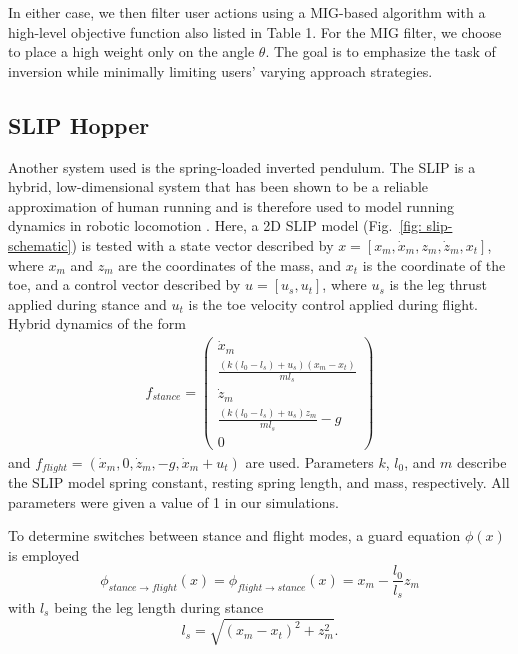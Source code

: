 In either case, we then filter user actions using a MIG-based algorithm with a high-level objective function also listed in Table 1. For the MIG filter, we choose to place a high weight only on the angle $\theta$. The goal is to emphasize the task of inversion while minimally limiting users' varying approach strategies.


\subsection{SLIP Hopper}

Another system used is the spring-loaded inverted pendulum. The SLIP is a hybrid, low-dimensional system that has been shown to be a reliable approximation of human running \cite{SLIP_for_running_nature} and is therefore used to model running dynamics in robotic locomotion \cite{SLIP_robot_evidence}. Here, a 2D SLIP model (Fig.~\ref{fig: slip-schematic}) is tested with a state vector described by $x = [x_m, \dot{x}_m, z_m, \dot{z}_m, x_t]$, where $x_m$ and $z_m$ are the coordinates of the mass, and $x_t$ is the coordinate of the toe, and a control vector described by $u = [u_s,u_t]$, where $u_s$ is the leg thrust applied during stance and $u_t$ is the toe velocity control applied during flight. Hybrid dynamics of the form
\begin{align*}
    f_{stance}= 
    \begin{pmatrix}
    \dot{x}_m \\
    \frac{(k(l_0-l_s)+u_s)(x_m-x_t)}{ml_s} \\
    \dot{z}_m \\
    \frac{(k(l_0-l_s)+u_s)z_m}{ml_s} - g \\
    0
    \end{pmatrix}
\end{align*}
and $f_{flight} = (\dot{x}_m,0,\dot{z}_m,-g,\dot{x}_m+u_t) $
are used. Parameters $k$, $l_0$, and $m$ describe the SLIP model spring constant, resting spring length, and mass, respectively. All parameters were given a value of 1 in our simulations. 

To determine switches between stance and flight modes, a guard equation $\phi(x)$ is employed
\begin{equation*}
    \phi_{stance \rightarrow flight}(x) = \phi_{flight \rightarrow stance}(x) = x_m - \frac{l_0}{l_s}z_m
\end{equation*}
with $l_s$ being the leg length during stance
\begin{equation*}
    l_s=\sqrt{(x_m-x_t)^2+z_m^2}.
\end{equation*}

